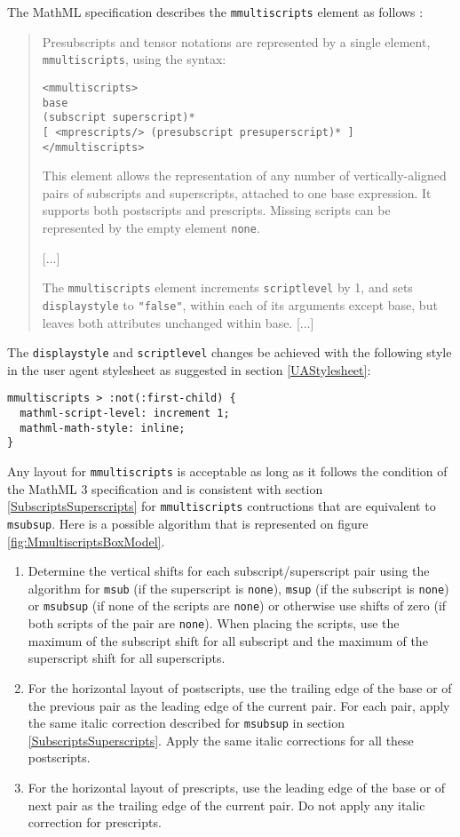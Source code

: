 The MathML specification describes the {\tt mmultiscripts} element as
follows \cite{MathML3}:
%
\begin{quote}
Presubscripts and tensor notations are represented by a single element,
{\tt mmultiscripts}, using the syntax:

{\tt <mmultiscripts> \\
  base \\
  (subscript superscript)* \\
  {[} <mprescripts/> (presubscript presuperscript)* {]} \\
</mmultiscripts>}

This element allows the representation of any number of vertically-aligned
pairs of subscripts and superscripts, attached to one base expression. It
supports both postscripts and prescripts. Missing scripts can be represented
by the empty element {\tt none}.

{[}...{]}

The {\tt mmultiscripts} element increments {\tt scriptlevel} by 1, and sets
{\tt displaystyle} to {\tt "false"}, within each of its arguments except base,
but leaves both attributes unchanged within base. [...]
\end{quote}
%

The {\tt displaystyle} and {\tt scriptlevel} changes be achieved with the
following style in the user agent stylesheet as suggested in section
\ref{UAStylesheet}:
%
\begin{lstlisting}
mmultiscripts > :not(:first-child) {
  mathml-script-level: increment 1;
  mathml-math-style: inline;
}
\end{lstlisting}
%

Any layout for {\tt mmultiscripts} is acceptable as long as it follows
the condition of the MathML 3 specification \cite{MathML3} and is consistent
with section \ref{SubscriptsSuperscripts} for {\tt mmultiscripts}
contructions that are equivalent to {\tt msubsup}. Here is a possible algorithm
that is represented on figure \ref{fig:MmultiscriptsBoxModel}.
\begin{enumerate}
\item Determine the vertical shifts for each subscript/superscript pair
  using the algorithm for {\tt msub} (if the superscript is {\tt none}),
  {\tt msup} (if the subscript is {\tt none}) or {\tt msubsup}
  (if none of the scripts are {\tt none}) or otherwise use shifts of zero
  (if both scripts of the pair are {\tt none}). When placing the scripts,
  use the maximum of the subscript shift for all subscript and
  the maximum of the superscript shift for all superscripts.
\item For the horizontal layout of postscripts, use the trailing edge of the
  base or of the previous pair as the leading edge of the current pair.
  For each pair, apply the same italic correction described for
  {\tt msubsup} in section \ref{SubscriptsSuperscripts}.
  Apply the same italic corrections for all these postscripts.
\item For the horizontal layout of prescripts, use the leading edge of the
  base or of next pair as the trailing edge of the current pair. Do not apply
  any italic correction for prescripts.
\end{enumerate}

